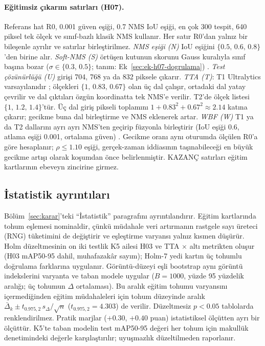 \paragraph{Eğitimsiz çıkarım satırları (H07).}
Referans hat R0, 0.001 güven eşiği, 0.7 NMS IoU eşiği, en çok 300 tespit, 640 piksel tek ölçek ve sınıf-bazlı klasik NMS kullanır. Her satır R0'dan yalnız bir bileşenle ayrılır ve satırlar birleştirilmez. \emph{NMS eşiği (N)} IoU eşiğini $\{0.5,\,0.6,\,0.8\}$'den birine alır. \emph{Soft-NMS (S)} örtüşen kutunun skorunu Gauss kuralıyla sınıf başına bozar ($\sigma\in\{0.3,\,0.5\}$; tanım: Ek~\ref{sec:ek-h07-dogrulama}) \cite{bodla_2017_softnms}. \emph{Test çözünürlüğü (U)} girişi 704, 768 ya da 832 piksele çıkarır. \emph{TTA (T)}: T1 Ultralytics varsayılanıdır \cite{ultralytics_2026_yolov5tta,ultralytics_2026_v84165}; ölçekleri $\{1,\,0.83,\,0.67\}$ olan üç dal çalışır, ortadaki dal yatay çevrilir ve dal çıktıları özgün koordinatta tek NMS'e verilir. T2'de ölçek listesi $\{1,\,1.2,\,1.4\}$'tür. Üç dal giriş pikseli toplamını $1+0.83^2+0.67^2\approx2.14$ katına çıkarır; gecikme buna dal birleştirme ve NMS eklenerek artar. \emph{WBF (W)} T1 ya da T2 dallarını ayrı ayrı NMS'ten geçirip füzyonla birleştirir (IoU eşiği 0.6, atlama eşiği 0.001, ortalama güven) \cite{solovyev_2021_wbf}. Gecikme oranı aynı oturumda ölçülen R0'a göre hesaplanır; $\rho\le1.10$ eşiği, gerçek-zaman iddiasının taşınabileceği en büyük gecikme artışı olarak koşumdan önce belirlenmiştir. KAZANÇ satırları eğitim kartlarının ebeveyn zincirine girmez.


\subsection{İstatistik ayrıntıları}\label{sec:ek-istatistik}
Bölüm~\ref{sec:karar}'teki ``İstatistik'' paragrafını ayrıntılandırır. Eğitim kartlarında tohum eşlemesi nominaldir, çünkü müdahale veri artırmanın rastgele sayı üreteci (RNG) tüketimini de değiştirir ve eşleştirme varyansı yalnız kısmen düşürür. Holm düzeltmesinin \cite{holm_1979_sequential} on iki testlik K5 ailesi H03 ve TTA $\times$ altı metrikten oluşur (H03 mAP50-95 dahil, muhafazakâr sayım); Holm-7 yedi kartın üç tohumlu doğrulama farklarına uygulanır. Görüntü-düzeyi eşli bootstrap \cite{efron_1979_bootstrap} aynı görüntü indekslerini varyanta ve taban modele uygular ($B=1000$, yüzde 95 yüzdelik aralığı; üç tohumun $\Delta$ ortalaması). Bu aralık eğitim tohumu varyansını içermediğinden eğitim müdahaleleri için tohum düzeyinde aralık $\bar\Delta_k\pm t_{0.975,2}\,s_\Delta/\sqrt n$ ($t_{0.975,2}=4.303$) de verilir. Düzeltmesiz $p<0.05$ tablolarda renklendirilmez. Pratik marjlar ($+0.30$, $+0.40$ puan) istatistiksel ölçütten ayrı bir ölçüttür. K5'te taban modelin test mAP50-95 değeri her tohum için makullük denetimindeki değerle karşılaştırılır; uyuşmazlık düzeltilmeden raporlanır.

